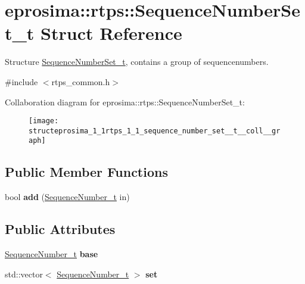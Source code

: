 \hypertarget{structeprosima_1_1rtps_1_1_sequence_number_set__t}{\section{eprosima\-:\-:rtps\-:\-:\-Sequence\-Number\-Set\-\_\-t \-Struct \-Reference}
\label{structeprosima_1_1rtps_1_1_sequence_number_set__t}
}


\-Structure \hyperlink{structeprosima_1_1rtps_1_1_sequence_number_set__t}{\-Sequence\-Number\-Set\-\_\-t}, contains a group of sequencenumbers.  




{\ttfamily \#include $<$rtps\-\_\-common.\-h$>$}



\-Collaboration diagram for eprosima\-:\-:rtps\-:\-:\-Sequence\-Number\-Set\-\_\-t\-:\nopagebreak
\begin{figure}[H]
\begin{center}
\leavevmode
\texttt{[image: structeprosima\_1\_1rtps\_1\_1\_sequence\_number\_set\_\_t\_\_coll\_\_graph]}
\end{center}
\end{figure}
\subsection*{\-Public \-Member \-Functions}
\begin{DoxyCompactItemize}
\item 
\hypertarget{structeprosima_1_1rtps_1_1_sequence_number_set__t_a06d8273ac52fe23be8f70f60c748df92}{bool {\bfseries add} (\hyperlink{structeprosima_1_1rtps_1_1_sequence_number__t}{\-Sequence\-Number\-\_\-t} in)}\label{structeprosima_1_1rtps_1_1_sequence_number_set__t_a06d8273ac52fe23be8f70f60c748df92}

\end{DoxyCompactItemize}
\subsection*{\-Public \-Attributes}
\begin{DoxyCompactItemize}
\item 
\hypertarget{structeprosima_1_1rtps_1_1_sequence_number_set__t_a4116c203752f6191fd5832db5ef7858b}{\hyperlink{structeprosima_1_1rtps_1_1_sequence_number__t}{\-Sequence\-Number\-\_\-t} {\bfseries base}}\label{structeprosima_1_1rtps_1_1_sequence_number_set__t_a4116c203752f6191fd5832db5ef7858b}

\item 
\hypertarget{structeprosima_1_1rtps_1_1_sequence_number_set__t_a224195ee2b7095d481f1eca00489c89f}{std\-::vector$<$ \hyperlink{structeprosima_1_1rtps_1_1_sequence_number__t}{\-Sequence\-Number\-\_\-t} $>$ {\bfseries set}}\label{structeprosima_1_1rtps_1_1_sequence_number_set__t_a224195ee2b7095d481f1eca00489c89f}

\end{DoxyCompactItemize}


